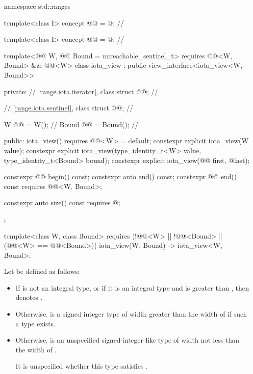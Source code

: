 %
\begin{codeblock}
namespace std::ranges {
  template<class I>
    concept @@ = @\seebelownc@;  // \expos

  template<class I>
    concept @@ = @\seebelownc@;    // \expos

  template<@@ W, @@ Bound = unreachable_sentinel_t>
    requires @@<W, Bound> && @@<W>
  class iota_view : public view_interface<iota_view<W, Bound>> {
  private:
    // \ref{range.iota.iterator}, class 
    struct @@;                    // \expos

    // \ref{range.iota.sentinel}, class 
    struct @@;                    // \expos

    W @@ = W();                     // \expos
    Bound @@ = Bound();             // \expos

  public:
    iota_view() requires @@<W> = default;
    constexpr explicit iota_view(W value);
    constexpr explicit iota_view(type_identity_t<W> value, type_identity_t<Bound> bound);
    constexpr explicit iota_view(@@ first, @\seebelow@ last);

    constexpr @@ begin() const;
    constexpr auto end() const;
    constexpr @@ end() const requires @@<W, Bound>;

    constexpr auto size() const requires @\seebelow@;
  };

  template<class W, class Bound>
    requires (!@@<W> || !@@<Bound> ||
              (@@<W> == @@<Bound>))
    iota_view(W, Bound) -> iota_view<W, Bound>;
}
\end{codeblock}

\pnum
Let  be defined as follows:
\begin{itemize}
\item
  If  is not an integral type, or
  if it is an integral type and 
  is greater than ,
  then  denotes .
\item
  Otherwise, 
  is a signed integer type of width greater than the width of 
  if such a type exists.
\item
  Otherwise, 
  is an unspecified signed-integer-like type
  of width not less than the width of .
  \begin{note}
  It is unspecified
  whether this type satisfies .
  \end{note}
\end{itemize}

